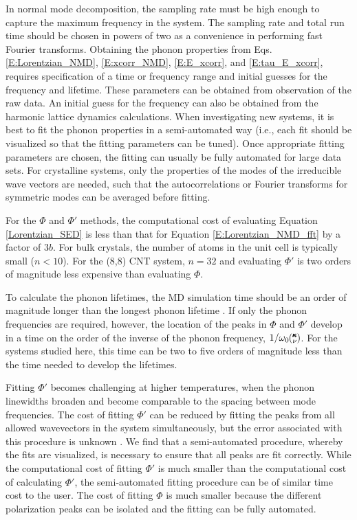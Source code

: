 In normal mode decomposition, the sampling rate must be high enough to 
capture the maximum frequency in the system. The sampling rate and total 
run time should be chosen in powers of two as a convenience in performing 
fast Fourier transforms. Obtaining the phonon properties from 
Eqs. \eqref{E:Lorentzian_NMD}, \eqref{E:xcorr_NMD}, 
\eqref{E:E_xcorr}, and \eqref{E:tau_E_xcorr}, 
requires specification of a time or frequency 
range and initial guesses for the frequency and lifetime. These parameters 
can be obtained from observation of the raw data. An initial guess for the 
frequency can also be obtained from the harmonic lattice dynamics 
calculations. When investigating new systems, it is best to fit the phonon 
properties in a semi-automated way (i.e., each fit should be visualized so 
that the fitting parameters can be tuned). Once appropriate fitting 
parameters are chosen, the fitting can usually be fully automated for large 
data sets. For crystalline systems, only the properties of the modes of the 
irreducible wave vectors are needed, such that the autocorrelations or 
Fourier transforms for symmetric modes can be averaged before fitting. 

For the $\Phi$ and $\Phi'$ methods, the computational cost of 
evaluating Equation \eqref{Lorentzian_SED} is less than that for 
Equation \eqref{E:Lorentzian_NMD_fft} by a factor of $3b$. 
For bulk crystals, the number of atoms in the unit cell is 
typically small 
($n<10$).  For the (8,8) CNT system, $n=32$ and evaluating $\Phi'$ is 
two orders of magnitude 
less expensive than evaluating $\Phi$.

To calculate the phonon lifetimes, the MD simulation time should be an 
order of magnitude 
longer than the longest phonon lifetime \cite{thomas_water_2010}.  
If only the 
phonon frequencies 
are required, however, the location of the peaks in $\Phi$ and $\Phi'$ 
develop in a time on 
the order of the inverse of the phonon frequency, $1/\omega_0\mspace{-4.0mu}\left(\mspace{-8.0mu} \begin{smallmatrix}&\pmb{\kappa} \\&\nu\end{smallmatrix} \mspace{-3.0mu}\right)$. For the 
systems studied 
here, this time can be two to five orders of magnitude less than the time 
needed to develop 
the lifetimes.

Fitting $\Phi'$ becomes challenging at higher temperatures, when the 
phonon linewidths 
broaden and become comparable to the spacing between mode frequencies. 
The cost of 
fitting $\Phi'$ can be reduced by fitting the peaks from all allowed 
wavevectors in the 
system simultaneously, but the error associated with this procedure is 
unknown 
\cite{shiomi_thermal_2011}. We find that a semi-automated procedure, 
whereby the fits are 
visualized, is necessary to ensure that all peaks are fit correctly.  
While the 
computational cost of fitting $\Phi'$ is much smaller than the 
computational cost of 
calculating $\Phi'$, the semi-automated fitting procedure can be of 
similar time cost 
to the user. The cost of fitting $\Phi$ is much smaller because the 
different polarization 
peaks can be isolated and the fitting can be fully automated.


